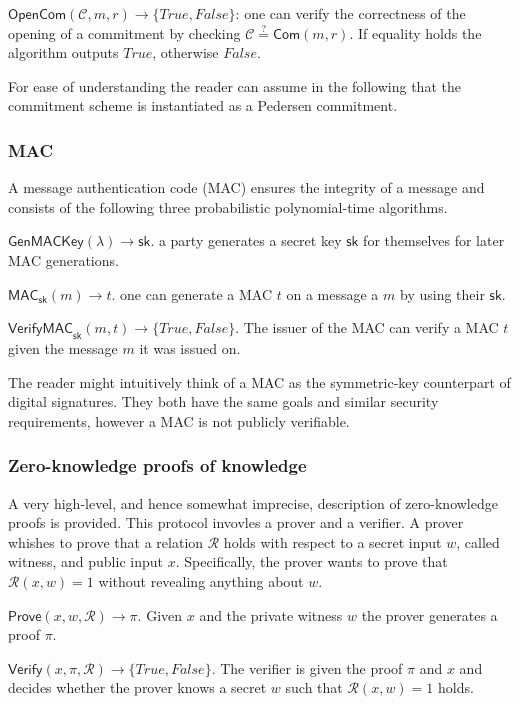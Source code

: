 \documentclass{article}
\begin{document}
\noindent$\mathsf{OpenCom}(\mathcal{C},m,r)\xrightarrow{}\{\mathit{True},\mathit{False}\}$: one can verify the correctness of the opening of a commitment by checking $\mathcal{C}\stackrel{?}{=}\mathsf{Com}(m,r)$. If equality holds the algorithm outputs $\mathit{True}$, otherwise $\mathit{False}$.

For ease of understanding the reader can assume in the following that the commitment scheme is instantiated as a Pedersen commitment.

\subsubsection{MAC}
A message authentication code (MAC) ensures the integrity of a message and consists of the following three probabilistic polynomial-time algorithms.

\noindent$\mathsf{GenMACKey}(\lambda)\xrightarrow{}{\mathsf{sk}}$. a party generates a secret key $\mathsf{sk}$ for themselves for later MAC generations.

\noindent$\mathsf{MAC}_{\mathsf{sk}}(m)\xrightarrow{}t$. one can generate a MAC $t$ on a message a $m$ by using their $\mathsf{sk}$.

\noindent$\mathsf{VerifyMAC}_{\mathsf{sk}}(m,t)\xrightarrow{}\{\mathit{True},\mathit{False}\}$. The issuer of the MAC can verify a MAC $t$ given the message $m$ it was issued on.

The reader might intuitively think of a MAC as the symmetric-key counterpart of digital signatures. They both have the same goals and similar security requirements, however a MAC is not publicly verifiable.

\subsubsection{Zero-knowledge proofs of knowledge}
A very high-level, and hence somewhat imprecise, description of zero-knowledge proofs is provided. This protocol invovles a prover and a verifier. A prover whishes to prove that a relation $\mathcal{R}$ holds with respect to a secret input $w$, called witness, and public input $x$. Specifically, the prover wants to prove that $\mathcal{R}(x,w)=1$ without revealing anything about $w$.

\noindent$\mathsf{Prove}(x,w,\mathcal{R})\xrightarrow{}\pi$. Given $x$ and the private witness $w$ the prover generates a proof $\pi$.

\noindent$\mathsf{Verify}(x,\pi,\mathcal{R})\xrightarrow{}\{\mathit{True},\mathit{False}\}$. The verifier is given the proof $\pi$ and $x$ and decides whether the prover knows a secret $w$ such that $\mathcal{R}(x,w)=1$ holds.
\end{document}

